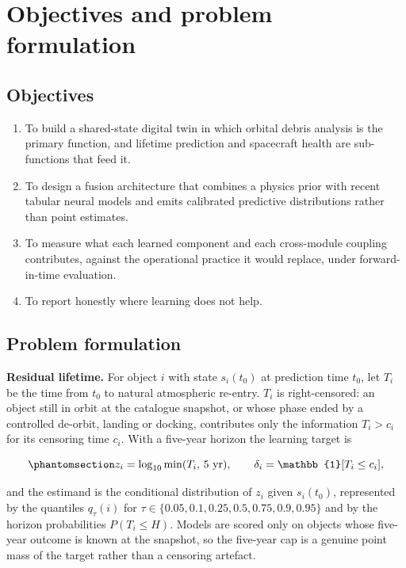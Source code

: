 \documentclass[3p,times]{elsarticle}
\providecommand{\tightlist}{\setlength{\itemsep}{0pt}\setlength{\parskip}{0pt}}
\providecommand{\tightlist}{\setlength{\itemsep}{0pt}\setlength{\parskip}{0pt}}
\begin{document}
\section{Objectives and problem formulation}\label{sec:objectives}

\subsection{Objectives}\label{objectives}

\begin{enumerate}
\def\labelenumi{\arabic{enumi}.}
\tightlist
\item
  To build a shared-state digital twin in which orbital debris analysis
  is the primary function, and lifetime prediction and spacecraft health
  are sub-functions that feed it.
\item
  To design a fusion architecture that combines a physics prior with
  recent tabular neural models and emits calibrated predictive
  distributions rather than point estimates.
\item
  To measure what each learned component and each cross-module coupling
  contributes, against the operational practice it would replace, under
  forward-in-time evaluation.
\item
  To report honestly where learning does not help.
\end{enumerate}

\subsection{Problem formulation}\label{problem-formulation}

\textbf{Residual lifetime.} For object \(i\) with state \(s_i(t_0)\) at
prediction time \(t_0\), let \(T_i\) be the time from \(t_0\) to natural
atmospheric re-entry. \(T_i\) is right-censored: an object still in
orbit at the catalogue snapshot, or whose phase ended by a controlled
de-orbit, landing or docking, contributes only the information
\(T_i > c_i\) for its censoring time \(c_i\). With a five-year horizon
the learning target is

\begin{equation}\protect\phantomsection\label{eq:target}{z_i = \log_{10} \min(T_i,\, 5\ \text{yr}), \qquad \delta_i = \mathbb{1}[T_i \leq c_i],}\end{equation}

and the estimand is the conditional distribution of \(z_i\) given
\(s_i(t_0)\), represented by the quantiles \(q_\tau(i)\) for
\(\tau \in \{0.05, 0.1, 0.25, 0.5, 0.75, 0.9, 0.95\}\) and by the
horizon probabilities \(P(T_i \leq H)\). Models are scored only on
objects whose five-year outcome is known at the snapshot, so the
five-year cap is a genuine point mass of the target rather than a
censoring artefact.
\end{document}
